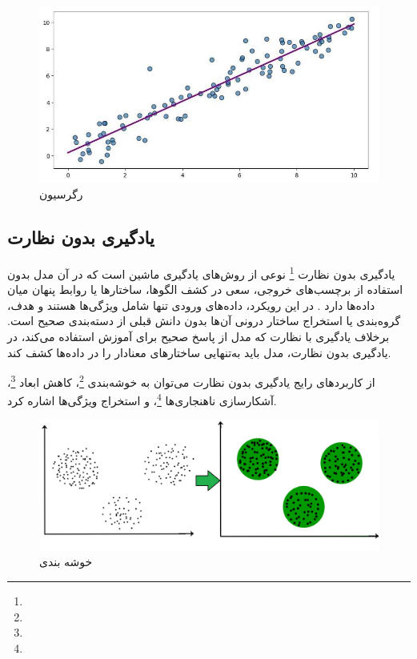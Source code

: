 \begin{figure}[h]
	\centering
	\begin{minipage}[b]{0.7\textwidth}
		\centering
		\includegraphics[width=\textwidth]{transformer_images/regression.jpg}
		\caption{رگرسیون}
		\label{fig:regerssion}
	\end{minipage}
	\hfill
\end{figure}



\subsection{یادگیری بدون نظارت}

یادگیری بدون نظارت \footnote{} نوعی از روش‌های یادگیری ماشین است که در آن مدل بدون استفاده از برچسب‌های خروجی، سعی در کشف الگوها، ساختارها یا روابط پنهان میان داده‌ها دارد \cite{bishop2006pattern}. در این رویکرد، داده‌های ورودی تنها شامل ویژگی‌ها هستند و هدف، گروه‌بندی یا استخراج ساختار درونی آن‌ها بدون دانش قبلی از دسته‌بندی صحیح است. برخلاف یادگیری با نظارت که مدل از پاسخ صحیح برای آموزش استفاده می‌کند، در یادگیری بدون نظارت، مدل باید به‌تنهایی ساختارهای معنادار را در داده‌ها کشف کند.

از کاربردهای رایج یادگیری بدون نظارت می‌توان به خوشه‌بندی \footnote{}، کاهش ابعاد \footnote{}، آشکارسازی ناهنجاری‌ها \footnote{}، و استخراج ویژگی‌ها اشاره کرد. 



\begin{figure}[h]
	\centering
	\begin{minipage}[b]{0.7\textwidth}
		\centering
		\includegraphics[width=\textwidth]{transformer_images/clustring.jpg}
		\caption{خوشه بندی}
		\label{fig:clustring}
	\end{minipage}
	\hfill
\end{figure}




